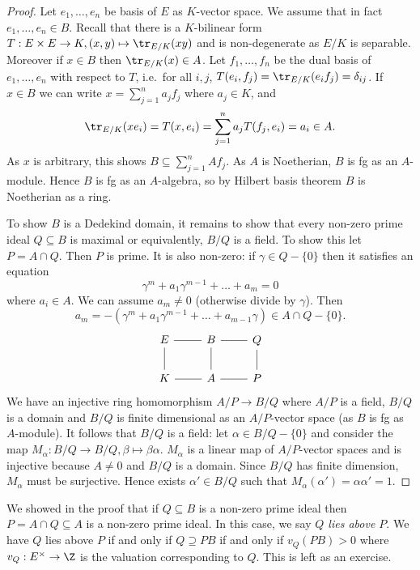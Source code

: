 \documentclass[a4paper]{article}
\begin{document}
\begin{proof}
  Let \(e_1, \dots, e_n\) be basis of \(E\) as \(K\)-vector space. We assume that in fact \(e_1, \dots, e_n \in B\). Recall that there is a \(K\)-bilinear form \(T: E \times E \to K, (x, y) \mapsto \tr_{E/K}(xy)\) and is non-degenerate as \(E/K\) is separable. Moreover if \(x \in B\) then \(\tr_{E/K}(x) \in A\). Let \(f_1, \dots, f_n\) be the dual basis of \(e_1, \dots, e_n\) with respect to \(T\), i.e.\ for all \(i, j\), \(T(e_i, f_j) = \tr_{E/K}(e_if_j) = \delta_{ij}\). If \(x \in B\) we can write \(x = \sum_{j = 1}^n a_jf_j\) where \(a_j \in K\), and
  \[
    \tr_{E/K}(x e_i) = T(x, e_i) = \sum_{j = 1}^n a_j T(f_j, e_i) = a_i \in A.
  \]
  As \(x\) is arbitrary, this shows \(B \subseteq \sum_{j = 1}^n Af_j\). As \(A\) is Noetherian, \(B\) is fg as an \(A\)-module. Hence \(B\) is fg as an \(A\)-algebra, so by Hilbert basis theorem \(B\) is Noetherian as a ring.

  To show \(B\) is a Dedekind domain, it remains to show that every non-zero prime ideal \(Q \subseteq B\) is maximal or equivalently, \(B/Q\) is a field. To show this let \(P = A \cap Q\). Then \(P\) is prime. It is also non-zero: if \(\gamma \in Q - \{0\}\) then it satisfies an equation
  \[
    \gamma^m + a_1 \gamma^{m - 1} + \dots + a_m = 0
  \]
  where \(a_i \in A\). We can assume \(a_m \neq 0\) (otherwise divide by \(\gamma\)). Then
  \[
    a_m = - (\gamma^m + a_1 \gamma^{m - 1} + \dots + a_{m - 1} \gamma) \in A \cap Q - \{0\}.
  \]
  \[
    \begin{tikzcd}
      E \ar[r, dash] \ar[d, dash] & B \ar[r, dash] \ar[d, dash] & Q \ar[d, dash] \\
      K \ar[r, dash] & A \ar[r, dash] & P
    \end{tikzcd}
  \]
  We have an injective ring homomorphism \(A/P \to B/Q\) where \(A/P\) is a field, \(B/Q\) is a domain and \(B/Q\) is finite dimensional as an \(A/P\)-vector space (as \(B\) is fg as \(A\)-module). It follows that \(B/Q\) is a field: let \(\alpha \in B/Q - \{0\}\) and consider the map \(M_\alpha: B/Q \to B/Q, \beta \mapsto \beta\alpha\). \(M_\alpha\) is a linear map of \(A/P\)-vector spaces and is injective because \(A \neq 0\) and \(B/Q\) is a domain. Since \(B/Q\) has finite dimension, \(M_\alpha\) must be surjective. Hence exists \(\alpha' \in B/Q\) such that \(M_\alpha(\alpha') = \alpha\alpha' = 1\).
\end{proof}

We showed in the proof that if \(Q \subseteq B\) is a non-zero prime ideal then \(P = A \cap Q \subseteq A\) is a non-zero prime ideal. In this case, we say \emph{\(Q\) lies above \(P\)}. We have \(Q\) lies above \(P\) if and only if \(Q \supseteq PB\) if and only if \(v_Q(PB) > 0\) where \(v_Q: E^\times \to \Z\) is the valuation corresponding to \(Q\). This is left as an exercise.
\end{document}
